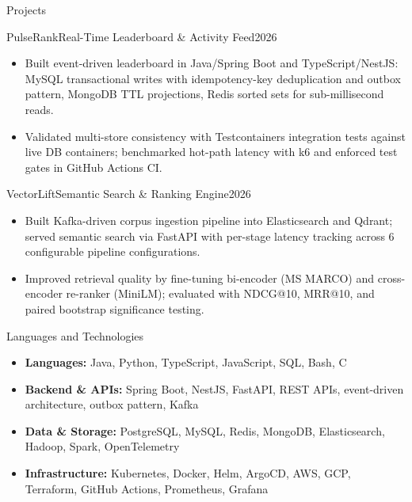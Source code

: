 \documentclass[]{mcdowellcv}
\begin{document}
\begin{cvsection}{Projects}
  \begin{cvsubsection}{PulseRank}{Real-Time Leaderboard \& Activity Feed}{2026}
    \begin{itemize}
      \item Built event-driven leaderboard in Java/Spring Boot and TypeScript/NestJS: MySQL transactional writes with idempotency-key deduplication and outbox pattern, MongoDB TTL projections, Redis sorted sets for sub-millisecond reads.
      \item Validated multi-store consistency with Testcontainers integration tests against live DB containers; benchmarked hot-path latency with k6 and enforced test gates in GitHub Actions CI.
    \end{itemize}
    \vspace{-1.5pt}
  \end{cvsubsection}

  \begin{cvsubsection}{VectorLift}{Semantic Search \& Ranking Engine}{2026}
    \begin{itemize}
      \item Built Kafka-driven corpus ingestion pipeline into Elasticsearch and Qdrant; served semantic search via FastAPI with per-stage latency tracking across 6 configurable pipeline configurations.
      \item Improved retrieval quality by fine-tuning bi-encoder (MS MARCO) and cross-encoder re-ranker (MiniLM); evaluated with NDCG@10, MRR@10, and paired bootstrap significance testing.
    \end{itemize}
    \vspace{-1.5pt}
  \end{cvsubsection}

\end{cvsection}

\begin{cvsection}{Languages and Technologies}
  \begin{cvsubsection}{}{}{}
    \begin{itemize}
      \item \textbf{Languages:} Java, Python, TypeScript, JavaScript, SQL, Bash, C
      \item \textbf{Backend \& APIs:} Spring Boot, NestJS, FastAPI, REST APIs, event-driven architecture, outbox pattern, Kafka
      \item \textbf{Data \& Storage:} PostgreSQL, MySQL, Redis, MongoDB, Elasticsearch, Hadoop, Spark, OpenTelemetry
      \item \textbf{Infrastructure:} Kubernetes, Docker, Helm, ArgoCD, AWS, GCP, Terraform, GitHub Actions, Prometheus, Grafana
    \end{itemize}
  \end{cvsubsection}
\end{cvsection}
\end{document}
